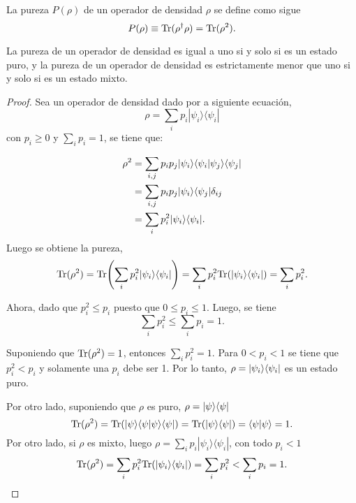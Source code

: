 \begin{definition} La pureza $P(\rho)$ de un operador de densidad $\rho$ se define como sigue {\cite{wilde2011classical}} \begin{equation}
	P(\rho)\equiv{\rm Tr}(\rho^\dagger\rho)={\rm Tr}(\rho^2).
\end{equation}

	\end{definition}


\begin{proposition}
	La pureza de un operador de densidad es igual a uno si y solo si es un estado puro, y la pureza de un operador de densidad es estrictamente menor que uno si y solo si es un estado mixto.
	\end{proposition}


\begin{proof}
	Sea un operador de densidad dado por a siguiente ecuación, \[\rho=\sum_i p_i |\psi_i\rangle \langle \psi_i|\] con $p_i\ge 0$ y $\sum_{i}p_i=1$, se tiene que:
	
	\begin{equation*}
		\begin{split}
			\rho^2&=\sum_{i,j} p_i p_j|\psi_i\rangle \langle \psi_i|\psi_j\rangle \langle \psi_j|\\
			&=\sum_{i,j} p_i p_j|\psi_i \rangle \langle \psi_j|\delta_{ij}\\
			&=\sum_i p_i^2|\psi_i \rangle \langle \psi_i|.
			\end{split}
	\end{equation*}
Luego se obtiene la pureza, \[{\rm Tr}(\rho^2)={\rm Tr}{\left(\sum_i p_i^2|\psi_i \rangle \langle \psi_i|\right)}=\sum_i p_i^2 {\rm Tr}(|\psi_i \rangle \langle\psi_i|)=\sum_i p_i^2.\]
	
Ahora, dado que $p_i^2 \le p_i $ puesto que $0 \le p_i \le 1$. Luego, se tiene \[\sum_i p_i^2\le\sum_i p_i=1.\]
	
Suponiendo que ${\rm Tr}(\rho^2)=1$, entonces $\sum_i p_i^{2}=1$. Para $0<p_i<1$ se tiene que  $p_i^2<p_i$ y solamente una $p_i$ debe ser 1. Por lo tanto, $\rho=|\psi_i\rangle \langle\psi_i|$ es un estado puro.
	 
Por otro lado, suponiendo que $\rho
$ es puro, $\rho=|\psi\rangle \langle \psi|$
\[{\rm Tr}(\rho^2)={\rm Tr}(|\psi\rangle \langle \psi|\psi\rangle \langle \psi|)={\rm Tr}(|\psi\rangle \langle
\psi|)=\langle\psi|\psi\rangle=1.\]
Por otro lado, si $\rho $ es mixto, luego $\rho=\sum_i
p_i|\psi_i\rangle \langle \psi_i|$, con todo $p_i<1$ \[{\rm Tr}(\rho^2)=\sum_i p_i^2
{\rm Tr}(|\psi_i \rangle \langle\psi_i|)=\sum_i p_i^2<\sum_i p_i=1.\]
	\end{proof}



